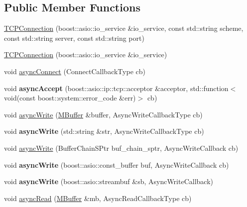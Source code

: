 \subsection*{Public Member Functions}
\begin{DoxyCompactItemize}
\item 
\hyperlink{class_t_c_p_connection_a1786a9f9ea84d1e504dee290d0425ce8}{T\+C\+P\+Connection} (boost\+::asio\+::io\+\_\+service \&io\+\_\+service, const std\+::string scheme, const std\+::string server, const std\+::string port)
\item 
\hyperlink{class_t_c_p_connection_af66a3430e661be59609f5cdbd2f19317}{T\+C\+P\+Connection} (boost\+::asio\+::io\+\_\+service \&io\+\_\+service)
\item 
void \hyperlink{class_t_c_p_connection_a4984a896404d02c9dc1135e788a71a4d}{async\+Connect} (Connect\+Callback\+Type cb)
\item 
\mbox{\label{class_t_c_p_connection_ab49c7b4120490daec460c9b0bd06dfbd}} 
void {\bfseries async\+Accept} (boost\+::asio\+::ip\+::tcp\+::acceptor \&acceptor, std\+::function$<$ void(const boost\+::system\+::error\+\_\+code \&err)$>$ cb)
\item 
void \hyperlink{class_t_c_p_connection_af45c4a0d2feb5faefd2d82505460bf15}{async\+Write} (\hyperlink{struct_m_buffer}{M\+Buffer} \&buffer, Async\+Write\+Callback\+Type cb)
\item 
\mbox{\label{class_t_c_p_connection_a39f657137386c99671e5b0bb660ac1ef}} 
void {\bfseries async\+Write} (std\+::string \&str, Async\+Write\+Callback\+Type cb)
\item 
void \hyperlink{class_t_c_p_connection_ad4b619a97387b39d107abfa4c3d9efe5}{async\+Write} (Buffer\+Chain\+S\+Ptr buf\+\_\+chain\+\_\+sptr, Async\+Write\+Callback cb)
\item 
\mbox{\label{class_t_c_p_connection_a99e5f8c52d41a365cb8a99cdf7b2e96d}} 
void {\bfseries async\+Write} (boost\+::asio\+::const\+\_\+buffer buf, Async\+Write\+Callback cb)
\item 
\mbox{\label{class_t_c_p_connection_a2bd787d3f088dcea9d48b993fa043a1c}} 
void {\bfseries async\+Write} (boost\+::asio\+::streambuf \&sb, Async\+Write\+Callback)
\item 
void \hyperlink{class_t_c_p_connection_a32fb26d3c6d30c59a5b8c5c7a056b1b9}{async\+Read} (\hyperlink{struct_m_buffer}{M\+Buffer} \&mb, Async\+Read\+Callback\+Type cb)

\end{DoxyCompactItemize}
